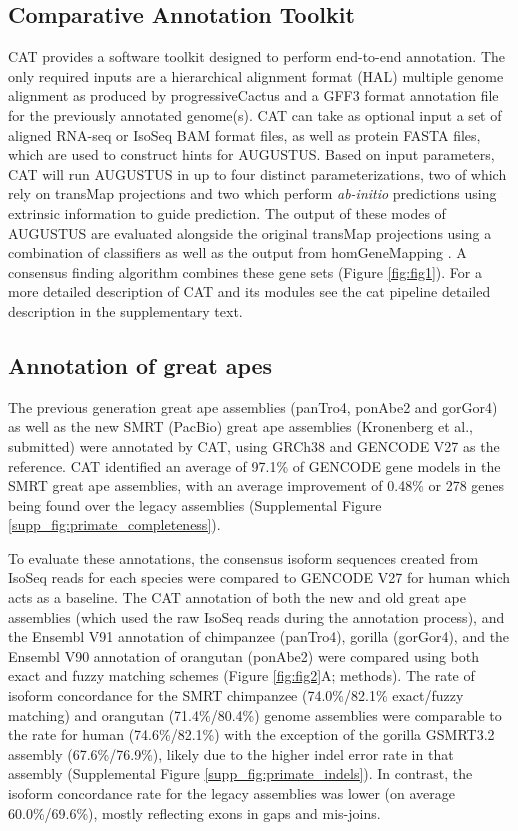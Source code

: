 \documentclass[fleqn,10pt]{wlscirep}
\begin{document}
\subsection*{Comparative Annotation Toolkit}
CAT provides a software toolkit designed to perform end-to-end annotation. The only required inputs are a hierarchical alignment format (HAL) \cite{hickey2013hal} multiple genome alignment as produced by progressiveCactus and a GFF3 format annotation file for the previously annotated genome(s). CAT can take as optional input a set of aligned RNA-seq or IsoSeq BAM format files, as well as protein FASTA files, which are used to construct hints for AUGUSTUS. Based on input parameters, CAT will run AUGUSTUS in up to four distinct parameterizations, two of which rely on transMap projections and two which perform \textit{ab-initio} predictions using extrinsic information to guide prediction. The output of these modes of AUGUSTUS are evaluated alongside the original transMap projections using a combination of classifiers as well as the output from homGeneMapping \cite{stanke2004augustus}. A consensus finding algorithm combines these gene sets (Figure \ref{fig:fig1}). For a more detailed description of CAT and its modules see the cat pipeline detailed description in the supplementary text.

\subsection*{Annotation of great apes}
The previous generation great ape assemblies (panTro4, ponAbe2 and gorGor4) as well as the new SMRT (PacBio) great ape assemblies \cite{gordon2016long} (Kronenberg et al., submitted) were annotated by CAT, using GRCh38  and GENCODE V27 as the reference. CAT identified an average of 97.1\% of GENCODE gene models in the SMRT great ape assemblies, with an average improvement of 0.48\% or 278 genes being found over the legacy assemblies  (Supplemental Figure \ref{supp_fig:primate_completeness}).

To evaluate these annotations, the consensus isoform sequences created from IsoSeq reads for each species were compared to GENCODE V27 for human which acts as a baseline. The CAT annotation of both the new and old great ape assemblies (which used the raw IsoSeq reads during the annotation process), and the Ensembl V91 annotation of chimpanzee (panTro4), gorilla (gorGor4), and the Ensembl V90 annotation of orangutan (ponAbe2) were compared using both exact and fuzzy matching schemes (Figure \ref{fig:fig2}A; methods). The rate of isoform concordance for the SMRT chimpanzee (74.0\%/82.1\% exact/fuzzy matching) and orangutan (71.4\%/80.4\%) genome assemblies were comparable to the rate for human (74.6\%/82.1\%) with the exception of the gorilla GSMRT3.2 assembly (67.6\%/76.9\%), likely due to the higher indel error rate in that assembly (Supplemental Figure \ref{supp_fig:primate_indels}). In contrast, the isoform concordance rate for the legacy assemblies was lower (on average 60.0\%/69.6\%), mostly reflecting exons in gaps and mis-joins.
\end{document}
